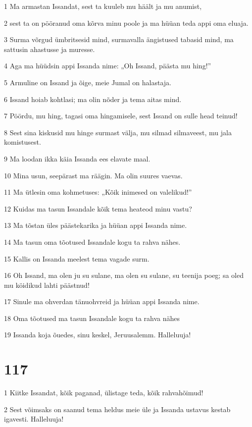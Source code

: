 \par 1 Ma armastan Issandat, sest ta kuuleb mu häält ja mu anumist,
\par 2 sest ta on pööranud oma kõrva minu poole ja ma hüüan teda appi oma eluaja.
\par 3 Surma võrgud ümbritsesid mind, surmavalla ängistused tabasid mind, ma sattusin ahastusse ja muresse.
\par 4 Aga ma hüüdsin appi Issanda nime: „Oh Issand, päästa mu hing!”
\par 5 Armuline on Issand ja õige, meie Jumal on halastaja.
\par 6 Issand hoiab kohtlasi; ma olin nõder ja tema aitas mind.
\par 7 Pöördu, mu hing, tagasi oma hingamisele, sest Issand on sulle head teinud!
\par 8 Sest sina kiskusid mu hinge surmast välja, mu silmad silmaveest, mu jala komistusest.
\par 9 Ma loodan ikka käia Issanda ees elavate maal.
\par 10 Mina usun, seepärast ma räägin. Ma olin suures vaevas.
\par 11 Ma ütlesin oma kohmetuses: „Kõik inimesed on valelikud!”
\par 12 Kuidas ma tasun Issandale kõik tema heateod minu vastu?
\par 13 Ma tõstan üles päästekarika ja hüüan appi Issanda nime.
\par 14 Ma tasun oma tõotused Issandale kogu ta rahva nähes.
\par 15 Kallis on Issanda meelest tema vagade surm.
\par 16 Oh Issand, ma olen ju su sulane, ma olen su sulane, su teenija poeg; sa oled mu köidikud lahti päästnud!
\par 17 Sinule ma ohverdan tänuohvreid ja hüüan appi Issanda nime.
\par 18 Oma tõotused ma tasun Issandale kogu ta rahva nähes
\par 19 Issanda koja õuedes, sinu keskel, Jeruusalemm. Halleluuja!

\chapter{117}

\par 1 Kiitke Issandat, kõik paganad, ülistage teda, kõik rahvahõimud!
\par 2 Sest võimsaks on saanud tema heldus meie üle ja Issanda ustavus kestab igavesti. Halleluuja!

